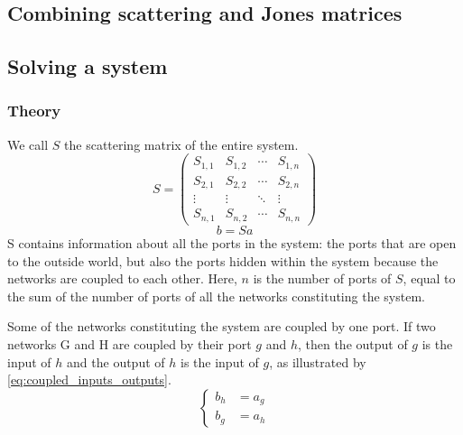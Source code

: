 \subsection{Combining scattering and Jones matrices}



\subsection{Solving a system}

\subsubsection{Theory}

We call $S$ the scattering matrix of the entire system.
\begin{equation*}
    S =
    \begin{pmatrix}
        S_{1, 1} & S_{1, 2} & \cdots & S_{1, n} \\
        S_{2, 1} & S_{2, 2} & \cdots & S_{2, n} \\
        \vdots   & \vdots   & \ddots & \vdots \\
        S_{n, 1} & S_{n, 2} & \cdots & S_{n, n}
    \end{pmatrix}
\end{equation*}
\begin{equation*}
    b = Sa
\end{equation*}
S contains information about all the ports in the system: the ports that are open to the outside world, but also the ports hidden within the system because the networks are coupled to each other.
Here, $n$ is the number of ports of $S$, equal to the sum of the number of ports of all the networks constituting the system.

Some of the networks constituting the system are coupled by one port.
If two networks G and H are coupled by their port $g$ and $h$, then the output of $g$ is the input of $h$ and the output of $h$ is the input of $g$, as illustrated by \cref{eq:coupled_inputs_outputs}.
\begin{equation}
    \left\lbrace
    \begin{aligned}
        b_h &= a_g \\
        b_g &= a_h
    \end{aligned}
    \right.
    \label{eq:coupled_inputs_outputs}
\end{equation}

